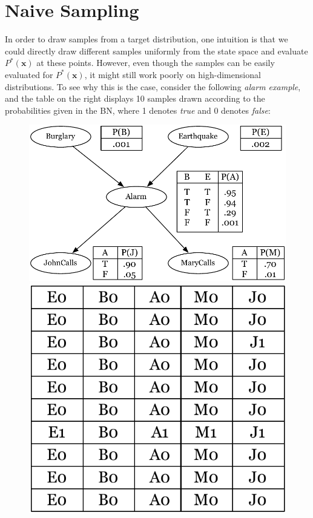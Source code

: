 \documentclass[twoside]{article}
\begin{document}
\section{Naive Sampling}
In order to draw samples from a target distribution, one intuition is that we could directly draw different samples uniformly from the state space and evaluate $P^*(\mathbf{x})$ at these points. However, even though the samples can be easily evaluated for $P^*(\mathbf{x})$, it might still work poorly on high-dimensional distributions. To see why this is the case, consider the following \textit{alarm example}, and the table on the right displays 10 samples drawn according to the probabilities given in the BN, where 1 denotes \textit{true} and 0 denotes \textit{false}:
\begin{figure}[H]
\begin{center}
\includegraphics[scale=0.5]{alarm_example}
\end{center}
\endminipage\hfill
{}
\begin{center}
\includegraphics[scale=0.5]{alarm_table}
\end{center} 
\endminipage\hfill \\
\end{figure}
\end{document}

